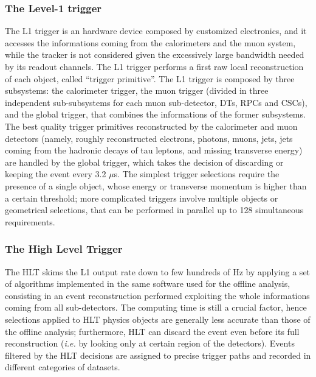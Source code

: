 \subsubsection{The Level-1 trigger}
The L1 trigger is an hardware device composed by customized electronics, and it accesses the informations coming from the calorimeters and the muon system, while the tracker is not considered given the excessively large bandwidth needed by its readout channels. The L1 trigger performs a first raw local reconstruction of each object, called ``trigger primitive''. The L1 trigger is composed by three subsystems: the calorimeter trigger, the muon trigger (divided in three independent sub-subsystems for each muon sub-detector, DTs, RPCs and CSCs), and the global trigger, that combines the informations of the former subsystems. The best quality trigger primitives reconstructed by the calorimeter and muon detectors (namely, roughly reconstructed electrons, photons, muons, jets, jets coming from the hadronic decays of tau leptons, and missing transverse energy) are handled by the global trigger, which takes the decision of discarding or keeping the event every 3.2 $\mu$s. The simplest trigger selections require the presence of a single object, whose energy or transverse momentum is higher than a certain threshold; more complicated triggers involve multiple objects or geometrical selections, that can be performed in parallel up to 128 simultaneous requirements.

\subsubsection{The High Level Trigger}
The HLT skims the L1 output rate down to few hundreds of Hz by applying a set of algorithms implemented in the same software used for the offline analysis, consisting in an event reconstruction performed exploiting the whole informations coming from all sub-detectors. The computing time is still a crucial factor, hence selections applied to HLT physics objects are generally less accurate than those of the offline analysis; furthermore, HLT can discard the event even before its full reconstruction (\textit{i.e.} by looking only at certain region of the detectors). Events filtered by the HLT decisions are assigned to precise trigger paths and recorded in different categories of datasets.

